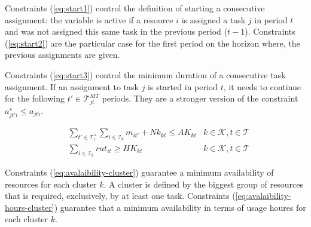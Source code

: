 \documentclass[a4paper,onecolumn,fleqn]{article}
\begin{document}
    Constraints (\ref{eq:start1}) control the definition of starting a consecutive assignment: the variable is active if a resource $i$ is assigned a task $j$ in period $t$ and was not assigned this same task in the previous period ($t-1$). Constraints (\ref{eq:start2}) are the particular case for the first period on the horizon where, the previous assignments are given.

    Constraints (\ref{eq:start3}) control the minimum duration of a consecutive task assignment. If an assignment to task $j$ is started in period $t$, it needs to continue for the following $t' \in \mathcal{T}^{MT}_{jt}$ periods. They are a stronger version of the constraint $ a^s_{jt'i} \leq a_{jti}$.

    \begin{align}
       & \sum_{t' \in \mathcal{T}^{s}_t} \sum_{i \in \mathcal{I}_k} m_{it'} + Nk_{kt} \leq AK_{kt}
        &k \in \mathcal{K}, t \in \mathcal{T} \label{eq:avalaibility-cluster} \\
       & \sum_{i \in \mathcal{I}_k} rut_{it} \geq HK_{kt}
        &k \in \mathcal{K}, t \in \mathcal{T} \label{eq:avalaibility-hours-cluster}
    \end{align}

    Constraints (\ref{eq:avalaibility-cluster}) guarantee a minimum availability of resources for each cluster $k$. A cluster is defined by the biggest group of resources that is required, exclusively, by at least one task. Constraints (\ref{eq:avalaibility-hours-cluster}) guarantee that a minimum availability in terms of usage houres for each cluster $k$.
\end{document}
